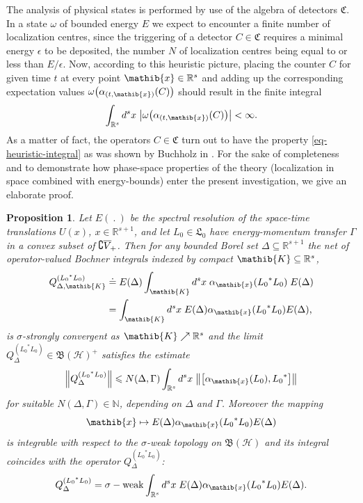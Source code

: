 \documentclass[11pt,twoside,openright]{report}
\theoremstyle{definition}
\theoremstyle{plain}
\newtheorem{Pro}[Def]{Proposition}
\theoremstyle{remark}
\theoremstyle{assumption}
\DeclareMathOperator{\sw}{\sigma-weak}
\newcommand{\bcomm}[2]{\bigl[ #1 , #2 \bigr]}
\newcommand{\babs}[1]{\bigl\lvert #1 \bigr\rvert}
\newcommand{\bnorm}[1]{\bigl\lVert #1 \bigr\rVert}
\newcommand{\Bnorm}[1]{\Bigl\lVert #1 \Bigr\rVert}
\newcommand{\Nbb}{\mathbb{N}}
\newcommand{\Cfrak}{\mathfrak{C}}
\newcommand{\Lfrak}{\mathfrak{L}}
\newcommand{\Kib}{\mathib{K}}
\newcommand{\xib}{\mathib{x}}
\newcommand{\Rs}{\mathbb{R}^s}
\newcommand{\Rsone}{\mathbb{R}^{s + 1}}
\newcommand{\BH}{\mathfrak{B} ( \mathscr{H} )}
\newcommand{\fwcone}{\overline{V}_{\negthinspace +}}
\newcommand{\ED}{E ( \Delta )}
\newcommand{\aibx}{\alpha_\mathib{x}}
\begin{document}
The analysis of physical states is performed by use of the algebra of
detectors $\Cfrak$. In a state $\omega$ of bounded energy $E$ we
expect to encounter a finite number of localization centres, since the
triggering of a detector $C \in \Cfrak$ requires a minimal energy
$\epsilon$ to be deposited, the number $N$ of localization centres
being equal to or less than $E/\epsilon$. Now, according to this
heuristic picture, placing the counter $C$ for given time $t$ at every
point $\xib \in \Rs$ and adding up the corresponding expectation
values $\omega \bigl( \alpha_{( t , \xib )} ( C ) \bigr)$ should
result in the finite integral
\begin{equation}
  \label{eq-heuristic-integral}
  \int_{\Rs} d^s x \; \babs{\omega \bigl( \alpha_{( t , \xib )} ( C )
    \bigr)} < \infty \text{.} 
\end{equation}
As a matter of fact, the operators $C \in \Cfrak$ turn out to have the
property \eqref{eq-heuristic-integral} as was shown by Buchholz in
\cite{buchholz:1990}. For the sake of completeness and to demonstrate
how phase-space properties of the theory (localization in space
combined with energy-bounds) enter the present investigation, we give
an elaborate proof.
\begin{Pro}
  \label{Pro-harmonic-analysis}
  Let $E (~.~)$ be the spectral resolution of the space-time
  translations $U ( x )$, $x \in \Rsone$, and let $L_0 \in \Lfrak_0$
  have energy-momentum transfer $\Gamma$ in a convex subset of
  $\complement \fwcone$. Then for any bounded Borel set $\Delta
  \subseteq \Rsone$ the net of operator-valued Bochner integrals
  indexed by compact $\Kib \subseteq \Rs$,
  \begin{equation*}
    \begin{split}
      Q_{\Delta , \Kib}^{( {L_0}^* L_0 )} & \doteq \ED \int_\Kib d^s x
      \; \aibx ( {L_0}^* L_0 ) \; \ED \\
      & = \int_\Kib d^s x \; \ED \aibx ( {L_0}^* L_0 ) \ED \text{,}
    \end{split}
  \end{equation*}
  is $\sigma$-strongly convergent as $\Kib \nearrow \Rs$ and the limit
  $Q_\Delta^{( {L_0}^* L_0 )} \in \BH^+$ satisfies the estimate
  \begin{equation}
    \label{eq-commutator-integral-estimate}
    \Bnorm{Q_\Delta^{( {L_0}^* L_0 )}} \leqslant N ( \Delta , \Gamma )
    \int_{\Rs} d^s x \; \bnorm{\bcomm{\aibx ( L_0 )}{{L_0}^*}}
  \end{equation}
  for suitable $N ( \Delta , \Gamma ) \in \Nbb$, depending on $\Delta$
  and $\Gamma$. Moreover the mapping
  \begin{equation*}
    \xib \mapsto \ED \aibx ( {L_0}^* L_0 ) \ED
  \end{equation*}
  is integrable with respect to the $\sigma$-weak topology on $\BH$
  and its integral coincides with the operator $Q_\Delta^{( {L_0}^*
  L_0 )}$:
  \begin{equation*}
    Q_\Delta^{( {L_0}^* L_0 )} = \sw \int_{\Rs} d^s x \; \ED \aibx (
    {L_0}^* L_0 ) \ED \text{.}
  \end{equation*}
\end{Pro}
\end{document}
